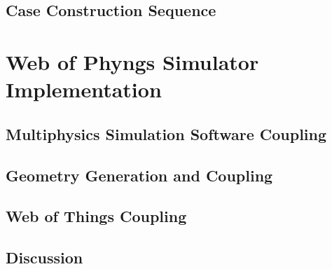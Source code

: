 \documentclass[%
    ]{\PathToTumTemplate/thesis/tum_thesis}
\begin{document}
\section{Case Construction Sequence}\label{sec:sequence}




\chapter{Web of Phyngs Simulator Implementation} \label{chap:wop}



\section{Multiphysics Simulation Software Coupling}\label{sec:mess_coupling}



\section{Geometry Generation and Coupling}\label{sec:geometry_coupling}



\section{Web of Things Coupling}\label{sec:wot_coupling}



\section{Discussion}\label{sec:wop_discussion}
\end{document}

